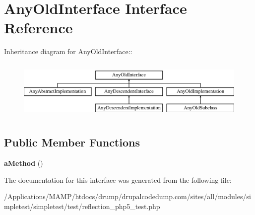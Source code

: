 \hypertarget{interface_any_old_interface}{
\section{AnyOldInterface Interface Reference}
\label{interface_any_old_interface}
}
Inheritance diagram for AnyOldInterface::\begin{figure}[H]
\begin{center}
\leavevmode
\includegraphics[height=2.91667cm]{interface_any_old_interface}
\end{center}
\end{figure}
\subsection*{Public Member Functions}
\begin{DoxyCompactItemize}
\item 
\hypertarget{interface_any_old_interface_ab79aa3bbaee9bd678faa380b2079728e}{
{\bfseries aMethod} ()}
\label{interface_any_old_interface_ab79aa3bbaee9bd678faa380b2079728e}

\end{DoxyCompactItemize}


The documentation for this interface was generated from the following file:\begin{DoxyCompactItemize}
\item 
/Applications/MAMP/htdocs/drump/drupalcodedump.com/sites/all/modules/simpletest/simpletest/test/reflection\_\-php5\_\-test.php\end{DoxyCompactItemize}
